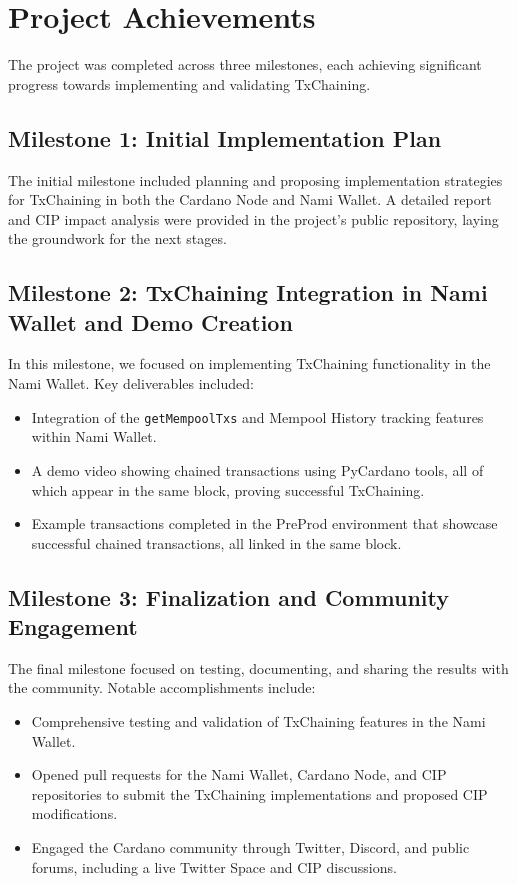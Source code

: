 \documentclass[11pt]{article}
\begin{document}
\section{Project Achievements}
The project was completed across three milestones, each achieving significant progress towards implementing and validating TxChaining.

\subsection{Milestone 1: Initial Implementation Plan}
The initial milestone included planning and proposing implementation strategies for TxChaining in both the Cardano Node and Nami Wallet. A detailed report and CIP impact analysis were provided in the project’s public repository, laying the groundwork for the next stages.

\subsection{Milestone 2: TxChaining Integration in Nami Wallet and Demo Creation}
In this milestone, we focused on implementing TxChaining functionality in the Nami Wallet. Key deliverables included:

\begin{itemize}
    \item Integration of the \texttt{getMempoolTxs} and Mempool History tracking features within Nami Wallet.
    \item A demo video showing chained transactions using PyCardano tools, all of which appear in the same block, proving successful TxChaining.
    \item Example transactions completed in the PreProd environment that showcase successful chained transactions, all linked in the same block.
\end{itemize}

\subsection{Milestone 3: Finalization and Community Engagement}
The final milestone focused on testing, documenting, and sharing the results with the community. Notable accomplishments include:

\begin{itemize}
    \item Comprehensive testing and validation of TxChaining features in the Nami Wallet.
    \item Opened pull requests for the Nami Wallet, Cardano Node, and CIP repositories to submit the TxChaining implementations and proposed CIP modifications.
    \item Engaged the Cardano community through Twitter, Discord, and public forums, including a live Twitter Space and CIP discussions.
\end{itemize}
\end{document}
